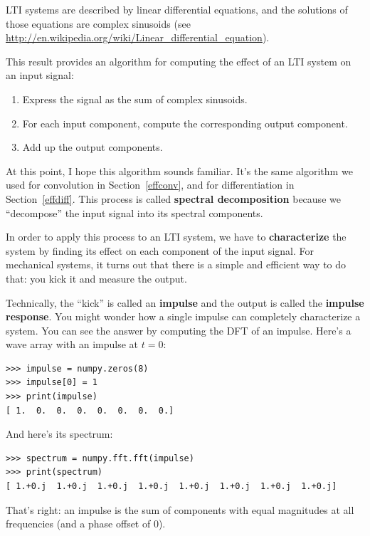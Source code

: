 \documentclass[12pt]{book}
\begin{document}
LTI systems are described by linear differential equations, and
the solutions of those equations are complex sinusoids (see
\url{http://en.wikipedia.org/wiki/Linear_differential_equation}).

This result provides an algorithm for computing the effect of
an LTI system on an input signal:

\begin{enumerate}

\item Express the signal as the sum of complex sinusoids.

\item For each input component, compute the corresponding output component.

\item Add up the output components.

\end{enumerate}

At this point, I hope this algorithm sounds familiar.  It's the
same algorithm we used for convolution in Section~\ref{effconv}, and
for differentiation in Section~\ref{effdiff}.  This process
is called {\bf spectral decomposition} because we ``decompose''
the input signal into its spectral components.

In order to apply this process to an LTI system, we have to {\bf
  characterize} the system by finding its effect on each component
of the input signal.  For mechanical systems, it turns out that there
is a simple and efficient way to do that: you kick it and measure
the output.

Technically, the ``kick'' is called an {\bf impulse} and the
output is called the {\bf impulse response}.  You might wonder
how a single impulse can completely characterize a system.  You
can see the answer by computing the DFT of an impulse.  Here's
a wave array with an impulse at $t=0$:

\begin{verbatim}
>>> impulse = numpy.zeros(8)
>>> impulse[0] = 1
>>> print(impulse)
[ 1.  0.  0.  0.  0.  0.  0.  0.]
\end{verbatim}

And here's its spectrum:

\begin{verbatim}
>>> spectrum = numpy.fft.fft(impulse)
>>> print(spectrum)
[ 1.+0.j  1.+0.j  1.+0.j  1.+0.j  1.+0.j  1.+0.j  1.+0.j  1.+0.j]
\end{verbatim}

That's right: an impulse is the sum of components with
equal magnitudes at all frequencies (and a phase offset of 0).
\end{document}
